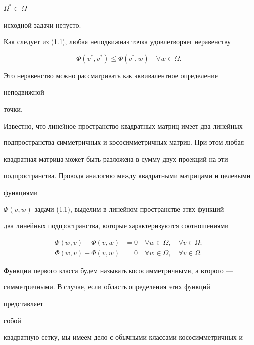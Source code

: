 $\Omega^*\subset\Omega$


исходной задачи непусто.





Как следует из (1.1), любая неподвижная точка удовлетворяет неравенству


\begin{equation}


\Phi(v^*,v^*)\le\Phi(v^*,w)\quad \forall w\in\Omega.


\end{equation}


Это неравенство можно рассматривать как эквивалентное определение


неподвижной


точки.





Известно, что линейное пространство квадратных матриц имеет два линейных


подпространства симметричных и кососимметричных матриц. При этом любая


квадратная матрица может быть разложена в сумму двух проекций на эти


подпространства. Проводя аналогию между квадратными матрицами и целевыми


функциями


$\Phi(v,w)$ задачи (1.1), выделим в линейном пространстве этих функций


два линейных подпространства, которые характеризуются соотношениями


\begin{align}


\Phi(w,v)+\Phi(v,w)&=0\quad  \forall w\in \Omega,\quad \forall


v\in\Omega;\\


\Phi(w,v)-\Phi(v,w)&=0\quad \forall w\in \Omega, \quad


\forall v\in\Omega.


\end{align}


Функции первого класса будем называть кососимметричными, а второго ---


симметричными. В случае, если область определения этих функций


представляет


собой


квадратную сетку, мы имеем дело с обычными классами кососимметричных и


